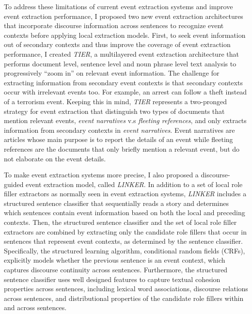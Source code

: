 To address 
these limitations of current event extraction systems and  
improve event extraction performance, 
I proposed two new event extraction architectures that 
incorporate discourse information across sentences 
to recognize event contexts before applying local extraction models. 
First, to seek event information out of secondary contexts and 
thus improve the coverage of event extraction performance, 
I created {\it TIER}, a multilayered event extraction architecture 
that performs document level, sentence level and noun phrase level 
text analysis to progressively 
``zoom in'' on relevant event information.
The challenge for extracting information from secondary event contexts 
is that 
secondary contexts occur with irrelevant events too.
For example, an arrest can follow a theft instead of a terrorism event.
Keeping this in mind, 
{\it TIER} represents a two-pronged strategy for event extraction that 
distinguish two types of documents that mention relevant events, 
{\it event narratives}  v.s {\it fleeting references}, 
and only 
extracts information from secondary contexts in 
{\it event narratives}. 
Event narratives are articles whose main purpose 
is to report the details of an event while 
fleeting references are the documents that only briefly mention a relevant
event, but do not elaborate on the event details. 

To make event extraction systems more precise,  
I also proposed a 
discourse-guided event extraction model, 
called {\it LINKER}.
In addition to 
a set of local role filler extractors as 
normally seen in event extraction systems, 
{\it LINKER}  
includes a structured sentence classifier 
that sequentially reads a
story and determines which sentences contain event
information based on both the local and preceding contexts.
Then, the structured sentence classifier and 
the set of local role filler extractors are combined 
by extracting only the candidate role
fillers that occur in sentences that 
represent event contexts, as determined by the sentence classifier.
Specifically, 
the structured learning algorithm, 
conditional random fields (CRFs), 
explicitly models whether the previous
sentence is an event context, 
which captures discourse continuity across sentences.
Furthermore, the structured sentence classifier 
uses well designed features to 
capture textual cohesion properties across sentences, 
including lexical word
associations, discourse relations across sentences,  and 
distributional properties of the candidate role fillers within
and across sentences. 

